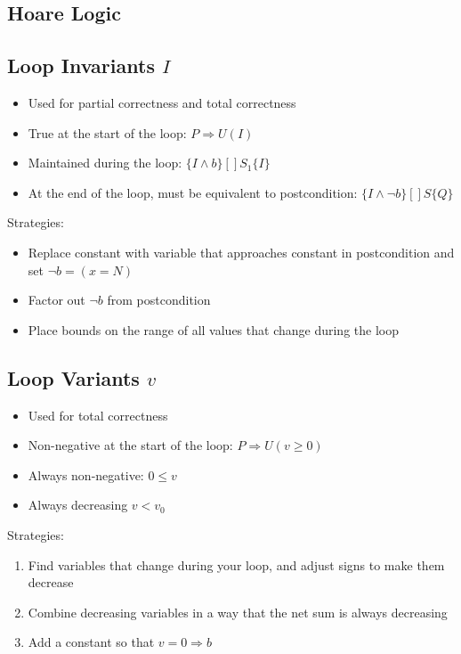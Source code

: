 \documentclass[landscape]{cheat}
\begin{document}
\begin{multicols*}{3}
\section{Hoare Logic}

\subsection{Loop Invariants $I$}
\begin{itemize}
    \item Used for partial correctness and total correctness
    \item True at the start of the loop: $P \Rightarrow U(I)$
    \item Maintained during the loop: $\{I \land b\}[]S_1\{I\}$
    \item At the end of the loop, must be equivalent to postcondition: $\{I \land \lnot b \}[]S\{Q\}$
\end{itemize}
Strategies:
\begin{itemize}
    \item Replace constant with variable that approaches constant in postcondition and set $\lnot b = (x = N)$
    \item Factor out $\lnot b$ from postcondition
    \item Place bounds on the range of all values that change during the loop
\end{itemize}

\subsection{Loop Variants $v$}
\begin{itemize}
    \item Used for total correctness
    \item Non-negative at the start of the loop: $P \Rightarrow U(v \geq 0)$
    \item Always non-negative: $0 \leq v$
    \item Always decreasing $v < v_0$
\end{itemize}
Strategies:
\begin{enumerate}
    \item Find variables that change during your loop, and adjust signs to make them decrease
    \item Combine decreasing variables in a way that the net sum is always decreasing
    \item Add a constant so that $v = 0 \Rightarrow b$
\end{enumerate}


\end{multicols*}
\end{document}
